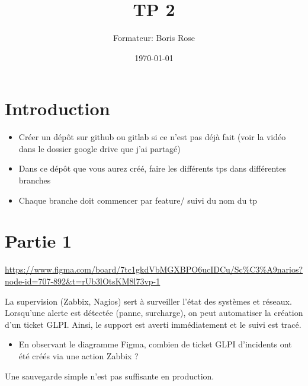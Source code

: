 \documentclass[12pt, letterpaper]{article}
\title{TP 2}
\author{Formateur: Boris Rose}
\date{\today}
\begin{document}
\maketitle

\section*{Introduction}

\begin{tcolorbox}[colback=brown!5,colframe=brown!60!black,title=Consignes]

\begin{itemize}
    \item Créer un dépôt sur github ou gitlab si ce n'est pas déjà fait (voir la vidéo dans le dossier google drive que j'ai partagé)
    \item Dans ce dépôt que vous aurez créé, faire les différents tps dans différentes branches
    \item Chaque branche doit commencer par feature/ suivi du nom du tp 
\end{itemize}


\end{tcolorbox}


\section*{Partie 1}


\begin{tcolorbox}[colback=cyan!5,colframe=cyan!60!black,title=Figma du Cours]
    \url{https://www.figma.com/board/7tc1gkdVbMGXBPO6ucIDCu/Sc%C3%A9narios?node-id=707-892&t=rUb3lOtsKM8l73vp-1}
\end{tcolorbox}


\begin{tcolorbox}[colback=brown!5,colframe=brown!60!black,title=Supervision]
    La supervision (Zabbix, Nagios) sert à surveiller l’état des systèmes et réseaux. Lorsqu’une alerte est détectée (panne, surcharge), on peut automatiser la création d’un ticket GLPI. Ainsi, le support est averti immédiatement et le suivi est tracé.
\end{tcolorbox}

\begin{itemize}
    \item En observant le diagramme Figma, combien de ticket GLPI d'incidents ont été créés via une action Zabbix ?
\end{itemize}

\begin{tcolorbox}[colback=brown!5,colframe=brown!60!black,title=Sauvegarde]
Une sauvegarde simple n’est pas suffisante en production. 
\end{tcolorbox}
\end{document}
